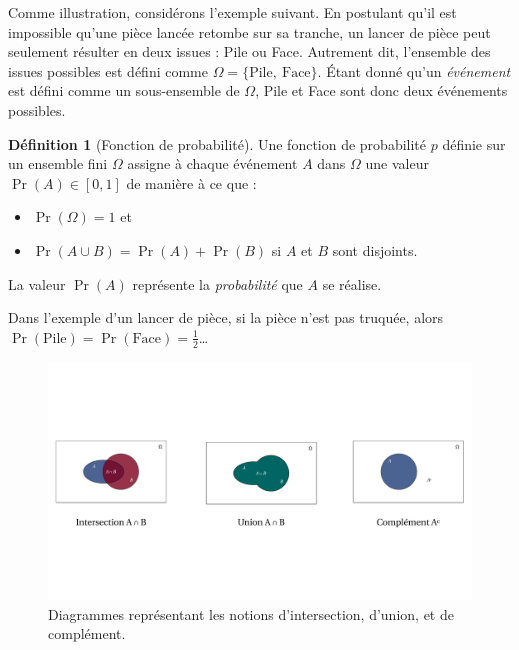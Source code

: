 \documentclass[
  a4paper,11pt,twoside,onecolumn,openright,final,oldfontcommands]{memoir}
\providecommand{\tightlist}{%
  \setlength{\itemsep}{0pt}\setlength{\parskip}{0pt}}
\theoremstyle{definition}
\newtheorem{definition}{Définition}[chapter]
\theoremstyle{definition}
\theoremstyle{definition}
\theoremstyle{definition}
\theoremstyle{remark}
\begin{document}
Comme illustration, considérons l'exemple suivant. En postulant qu'il est impossible qu'une pièce lancée retombe sur sa tranche, un lancer de pièce peut seulement résulter en deux issues : Pile ou Face. Autrement dit, l'ensemble des issues possibles est défini comme \(\Omega = \{\text{Pile}, \ \text{Face}\}\). Étant donné qu'un \emph{événement} est défini comme un sous-ensemble de \(\Omega\), Pile et Face sont donc deux événements possibles.

\begin{definition}[Fonction de probabilité]
\protect\hypertarget{def:prob-function}{}\label{def:prob-function}Une fonction de probabilité \(p\) définie sur un ensemble fini \(\Omega\) assigne à chaque événement \(A\) dans \(\Omega\) une valeur \(\Pr(A) \in [0, 1]\) de manière à ce que :

\begin{itemize}
\tightlist
\item
  \(\Pr(\Omega) = 1\) et
\item
  \(\Pr(A \cup B) = \Pr(A) + \Pr(B)\) si \(A\) et \(B\) sont disjoints.
\end{itemize}

La valeur \(\Pr(A)\) représente la \emph{probabilité} que \(A\) se réalise.
\end{definition}

Dans l'exemple d'un lancer de pièce, si la pièce n'est pas truquée, alors \(\Pr(\text{Pile}) = \Pr(\text{Face}) = \frac{1}{2}\)\ldots{}

\begin{figure}[!htb]

{\centering \includegraphics[width=1\linewidth]{figures/venn} 

}

\caption{Diagrammes représentant les notions d'intersection, d'union, et de complément.}\label{fig:venn}
\end{figure}
\end{document}
